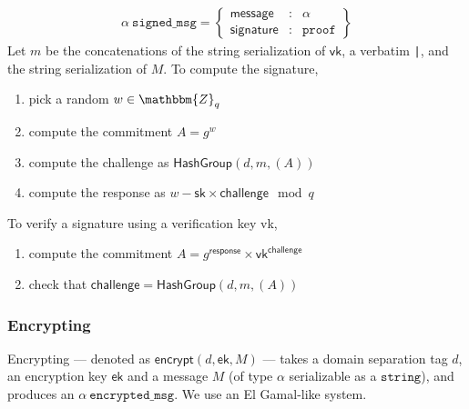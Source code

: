 \documentclass[a4paper]{article}
\newcommand{\Z}{\mathbbm{Z}}
\newcommand{\jstring}{\texttt{string}}
\begin{document}
\begin{gather*}
  \alpha\ \texttt{signed\_msg}=\left\{
    \begin{array}{rcl}
      \textsf{message}&:&\alpha\\
      \textsf{signature}&:&\texttt{proof}
    \end{array}
  \right\}
\end{gather*}
Let $m$ be the concatenations of the string serialization of
$\textsf{vk}$, a verbatim \verb=|=, and the string serialization of
$M$.  To compute the \textsf{signature},
\begin{enumerate}
\item pick a random $w\in\Z_q$
\item compute the commitment $A=g^w$
\item compute the \textsf{challenge} as $\textsf{HashGroup}(d,m,(A))$
\item compute the \textsf{response} as
  $w-\textsf{sk}\times\textsf{challenge}\mod q$
\end{enumerate}
To verify a \textsf{signature} using a verification key \textsf{vk},
\begin{enumerate}
\item compute the commitment $A=g^{\textsf{response}}\times\textsf{vk}^{\textsf{challenge}}$
\item check that $\textsf{challenge}=\textsf{HashGroup}(d,m,(A))$
\end{enumerate}

\subsubsection{Encrypting}

Encrypting --- denoted as $\textsf{encrypt}(d,\textsf{ek},M)$ ---
takes a domain separation tag $d$, an encryption key $\textsf{ek}$ and
a message $M$ (of type $\alpha$ serializable as a $\jstring$), and
produces an $\alpha\ \texttt{encrypted\_msg}$. We use an El Gamal-like
system.
\end{document}
